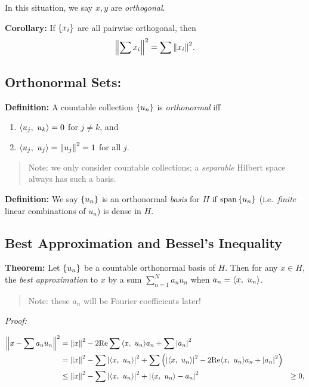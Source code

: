 In this situation, we say \(x,y\) are \emph{orthogonal}.

\textbf{Corollary:} If \(\left\{{x_i}\right\}\) are all pairwise orthogonal,
then
\begin{align*}
{\left\lVert {\sum x_i} \right\rVert}^2 = \sum {\left\lVert {x_i} \right\rVert}^2
.\end{align*}

\hypertarget{orthonormal-sets}{%
\subsection{Orthonormal Sets:}\label{orthonormal-sets}}

\textbf{Definition:} A countable collection \(\left\{{u_n}\right\}\) is
\emph{orthonormal} iff

\begin{enumerate}
\def\labelenumi{\arabic{enumi}.}
\tightlist
\item
  \({\left\langle {u_j},~{u_k} \right\rangle} = 0\) for \(j\neq k\), and
\item
  \({\left\langle {u_j},~{u_j} \right\rangle} = {\left\lVert {u_j} \right\rVert}^2 = 1\) for all \(j\).
\end{enumerate}

\begin{quote}
Note: we only consider countable collections; a \emph{separable} Hilbert
space always has such a basis.
\end{quote}

\textbf{Definition:} We say \(\left\{{u_n}\right\}\) is an orthonormal
\emph{basis} for \(H\) if \(\mathrm{span} \left\{{u_n}\right\}\)
(i.e.~\emph{finite} linear combinations of \(u_n\)) is dense in \(H\).

\hypertarget{best-approximation-and-bessels-inequality}{%
\subsection{Best Approximation and Bessel's
Inequality}\label{best-approximation-and-bessels-inequality}}

\textbf{Theorem:} Let \(\left\{{u_n}\right\}\) be a countable orthonormal basis
of \(H\). Then for any \(x\in H\), the \emph{best approximation} to
\(x\) by a sum \(\sum_{n=1}^N a_n u_n\) when \(a_n = {\left\langle {x},~{u_n} \right\rangle}\).

\begin{quote}
Note: these \(a_n\) will be Fourier coefficients later!
\end{quote}

\emph{Proof:}

\begin{align*}
{\left\lVert {x - \sum a_n u_n} \right\rVert}^2 
&= {\left\lVert {x} \right\rVert}^2 - 2\mathrm{Re} \sum {\left\langle {x},~{u_n} \right\rangle}a_n + \sum {\left\lvert {a_n} \right\rvert}^2 \\
&= {\left\lVert {x} \right\rVert}^2 - \sum {\left\lvert {{\left\langle {x},~{u_n} \right\rangle}} \right\rvert}^2 + \sum\left( {\left\lvert {{\left\langle {x},~{u_n} \right\rangle}} \right\rvert}^2 - 2\mathrm{Re}{\left\langle {x},~{u_n} \right\rangle}a_n + {\left\lvert {a_n} \right\rvert}^2  \right) \\
&\leq {\left\lVert {x} \right\rVert}^2 - \sum {\left\lvert {{\left\langle {x},~{u_n} \right\rangle}} \right\rvert}^2 + {\left\lvert {{\left\langle {x},~{u_n} \right\rangle} - a_n  } \right\rvert}^2 
&\geq 0
,\end{align*}

